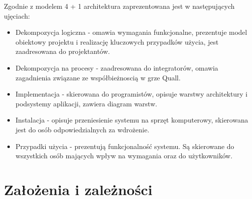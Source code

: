\documentclass[12pt,a4paper,twoside]{article}
\begin{document}
Zgodnie z modelem 4 + 1 architektura zaprezentowana jest w następujących ujęciach:

\begin{itemize}
\item Dekompozycja logiczna - omawia wymagania funkcjonalne, prezentuje model obiektowy projektu i realizację kluczowych przypadków użycia, jest zaadresowana do projektantów.
\item Dekompozycja na procesy - zaadresowana do integratorów, omawia zagadnienia związane ze współbieżnoscią w grze Quall. 
\item Implementacja - skierowana do programistów, opisuje warstwy architektury i podsystemy aplikacji, zawiera diagram warstw.
\item Instalacja - opisuje przeniesienie systemu na sprzęt komputerowy, skierowana jest do osób odpowiedzialnych za wdrożenie.
\item Przypadki użycia - prezentują funkcjonalność systemu. Są skierowane do wszystkich osób mających wpływ na wymagania oraz do użytkowników.
\end{itemize}

\section{Założenia i zależności}


\end{document}
